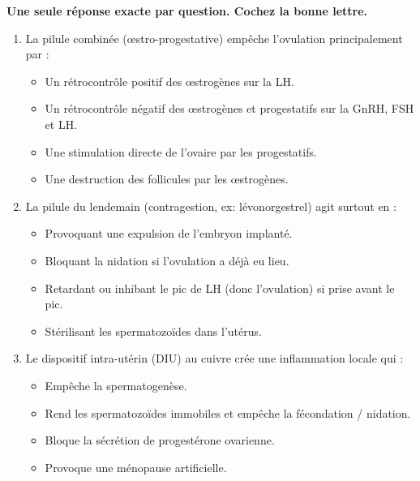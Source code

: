 \documentclass[11pt]{article}
\begin{document}
\begin{exercice}
\textbf{Une seule réponse exacte par question. Cochez la bonne lettre.}
\begin{enumerate}
    \item La pilule combinée (œstro-progestative) empêche l'ovulation principalement par :
    \begin{itemize}
        \item[A.] Un rétrocontrôle positif des œstrogènes sur la LH.
        \item[B.] Un rétrocontrôle négatif des œstrogènes et progestatifs sur la GnRH, FSH et LH.
        \item[C.] Une stimulation directe de l'ovaire par les progestatifs.
        \item[D.] Une destruction des follicules par les œstrogènes.
    \end{itemize}
    \item La pilule du lendemain (contragestion, ex: lévonorgestrel) agit surtout en :
    \begin{itemize}
        \item[A.] Provoquant une expulsion de l'embryon implanté.
        \item[B.] Bloquant la nidation si l'ovulation a déjà eu lieu.
        \item[C.] Retardant ou inhibant le pic de LH (donc l'ovulation) si prise avant le pic.
        \item[D.] Stérilisant les spermatozoïdes dans l'utérus.
    \end{itemize}
    \item Le dispositif intra-utérin (DIU) au cuivre crée une inflammation locale qui :
    \begin{itemize}
        \item[A.] Empêche la spermatogenèse.
        \item[B.] Rend les spermatozoïdes immobiles et empêche la fécondation / nidation.
        \item[C.] Bloque la sécrétion de progestérone ovarienne.
        \item[D.] Provoque une ménopause artificielle.
    \end{itemize}
\end{enumerate}
\end{exercice}
\end{document}
